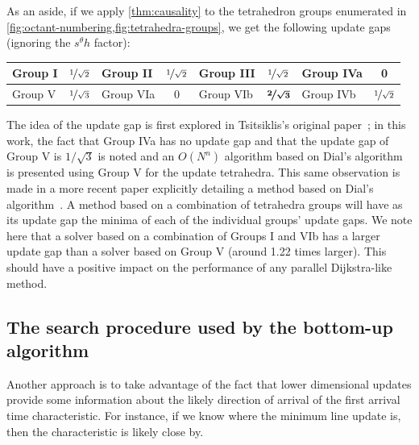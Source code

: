 \documentclass[eikonal.tex]{subfiles}
\begin{document}
As an aside, if we apply \cref{thm:causality} to the tetrahedron
groups enumerated in
\cref{fig:octant-numbering,fig:tetrahedra-groups}, we get the
following update gaps (ignoring the $s^\theta h$ factor):
\vspace{0.5em}
\begin{center}
  \begin{tabular}{lc|lc|lc|lc}
    Group I & $\nicefrac{1}{\sqrt{2}}$ & Group II & $\nicefrac{1}{\sqrt{2}}$ & Group III & $\nicefrac{1}{\sqrt{2}}$ & Group IVa & 0 \\
    \midrule
    Group V & $\nicefrac{1}{\sqrt{3}}$ & Group VIa & 0 & Group VIb & $\boldsymbol{\nicefrac{2}{\sqrt{3}}}$ & Group IVb & $\nicefrac{1}{\sqrt{2}}$
  \end{tabular}
\end{center}
\vspace{0.5em} The idea of the update gap is first explored in
Tsitsiklis's original paper~\cite{tsitsiklis1995efficient}; in this
work, the fact that Group IVa has no update gap and that the update
gap of Group V is $1/\sqrt{3}$ is noted and an $O(N^n)$ algorithm based
on Dial's algorithm is presented using Group V for the update
tetrahedra. This same observation is made in a more recent paper
explicitly detailing a method based on Dial's
algorithm~\cite{kim2001calo}. A method based on a combination of
tetrahedra groups will have as its update gap the minima of each of
the individual groups' update gaps. We note here that a solver based
on a combination of Groups I and VIb has a larger update gap than a
solver based on Group V (around 1.22 times larger). This should have a
positive impact on the performance of any parallel Dijkstra-like
method.

\subsection{The search procedure used by the bottom-up
  algorithm}\label{ssec:bottom-up-search}

Another approach is to take advantage of the fact that lower
dimensional updates provide some information about the likely
direction of arrival of the first arrival time characteristic. For
instance, if we know where the minimum line update is, then the
characteristic is likely close by.
\end{document}
